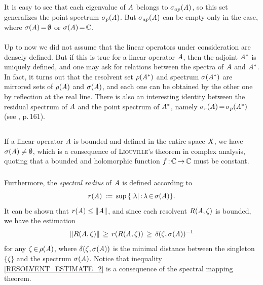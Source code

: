\documentclass[11pt,twoside]{article}
\begin{document}
\subparagraph{}
It is easy to see that
each eigenvalue of $\mathit{A}$ belongs to $\sigma_{ap}(\mathit{A})$,
so this set generalizes the point spectrum $\sigma_p(\mathit{A})$.
But $\sigma_{ap}(\mathit{A})$ can be empty only in the case,
where $\sigma(\mathit{A}) {\,=\,} \emptyset$ or $\sigma(\mathit{A}) {\,=\,} {\mathbb{C}}$.

\paragraph{} %
Up to now we did not assume that
the linear operators under consideration are densely defined.
But if this is true for a linear operator $\mathit{A}$,
then the adjoint $\mathit{A}^*$ is uniquely defined,
and one may ask for relations between the spectra of $\mathit{A}$ and $\mathit{A}^*$.
In fact,
it turns out that
the resolvent set $\rho(\mathit{A}^*)$ and spectrum $\sigma(\mathit{A}^*)$
are mirrored sets of $\rho(\mathit{A})$ and $\sigma(\mathit{A})$,
and each one can be obtained by the other one by reflection at the real line.
There is also an interesting identity between the residual spectrum of $\mathit{A}$
and the point spectrum of $\mathit{A}^*$,
namely
$\sigma_r(\mathit{A}) {\,=\,} \sigma_p(\mathit{A}^*)$ (see \cite{EN}, p.\,161).

\subsection{} %
If a linear operator $\mathit{A}$ is bounded and defined in the entire space $\mathit{X}$,
we have $\sigma(\mathit{A}) \neq \emptyset$,
which is a consequence of \textsc{Liouville}'s theorem in complex analysis,
quoting that a bounded and holomorphic function $f {\,:\,}{\mathbb{C}} {\,\to\,} {\mathbb{C}}$
must be constant.

\subparagraph{} %
Furthermore,
the \textit{spectral radius} of $\mathit{A}$ is defined according to
\[
r(\linA) \eqdef \sup \, \{\abs{\lambda} \: \lambda \xeof \sigma(\linA)\}.
\]
It can be shown that $r(\mathit{A}) \leq \left\lVert \mathit{A} \right\rVert$,
and since each resolvent $R(\mathit{A},\zeta)$ is bounded,
we have the estimation
\begin{equation}\label{RESOLVENT_ESTIMATE_2}
\left\lVert R(\mathit{A},\zeta) \right\rVert \, \geq \,
r(R(\mathit{A},\zeta))     \, \geq \,
\delta(\zeta,\sigma(\mathit{A}))^{-1}
\end{equation}
for any $\zeta {\,\in\,} \rho(\mathit{A})$,
where $\delta(\zeta,\sigma(\mathit{A}))$ is the minimal distance between
the singleton $\{\zeta\}$ and the spectrum $\sigma(\mathit{A})$.
Notice that inequality \eqref{RESOLVENT_ESTIMATE_2} is a consequence
of the spectral mapping theorem.
\end{document}

